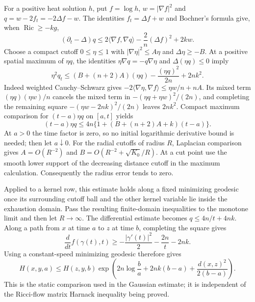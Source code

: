 For a positive heat solution $h$, put $f=\log h$,
$w=|\nabla f|^2$ and $q=w-2f_t=-2\Delta f-w$.
The identities $f_t=\Delta f+w$ and Bochner's formula give, when
$\operatorname{Ric}\geq-kg$,
\[
 (\partial_t-\Delta)q
 \leq2\langle\nabla f,\nabla q\rangle
                          -\frac{2}{n}(\Delta f)^2+2kw.
\]
Choose a compact cutoff $0\leq\eta\leq1$ with
$|\nabla\eta|^2\leq A\eta$ and $\Delta\eta\geq-B$.
At a positive spatial maximum of $\eta q$, the identities
$\eta\nabla q=-q\nabla\eta$ and $\Delta(\eta q)\leq0$ imply
\[
 \eta^2q_t\leq(B+(n+2)A)(\eta q)
                  -\frac{(\eta q)^2}{2n}+2nk^2.
\]
Indeed weighted Cauchy--Schwarz gives
$-2\langle\nabla\eta,\nabla f\rangle\leq\eta w/n+nA$.
Its mixed term $(\eta q)(\eta w)/n$ cancels the mixed term in
$-(\eta q+\eta w)^2/(2n)$, and completing the remaining square
$-(\eta w-2nk)^2/(2n)$ leaves $2nk^2$.
Compact maximum comparison for $(t-a)\eta q$ on $[a,t]$ yields
\[
 (t-a)\eta q\leq4n\{1+(B+(n+2)A+k)(t-a)\}.
\]
At $a>0$ the time factor is zero, so no initial logarithmic derivative
bound is needed; then let $a\downarrow0$.
For the radial cutoffs of radius $R$, Laplacian comparison gives
$A=O(R^{-2})$ and $B=O(R^{-2}+\sqrt{K_0}/R)$.
At a cut point use the smooth lower support of the decreasing
distance cutoff in the maximum calculation.  Consequently the
radius error tends to zero.

Applied to a kernel row, this estimate holds along a fixed minimizing
geodesic once its surrounding cutoff ball and the other kernel
variable lie inside the exhaustion domain.  Pass the resulting
finite-domain inequalities to the monotone limit and then let
$R\to\infty$.  The differential estimate becomes
$q\leq4n/t+4nk$.  Along a path from $x$ at time $a$ to $z$ at
time $b$, completing the square gives
\[
 \frac d{dt}f(\gamma(t),t)
 \geq-\frac{|\gamma'(t)|^2}{2}-\frac{2n}{t}-2nk.
\]
Using a constant-speed minimizing geodesic therefore gives
\[
 H(x,y,a)\leq H(z,y,b)
 \exp\left(2n\log\frac ba+2nk(b-a)
                       +\frac{d(x,z)^2}{2(b-a)}\right).
\]
This is the static comparison used in the Gaussian estimate; it is
independent of the Ricci-flow matrix Harnack inequality being proved.

